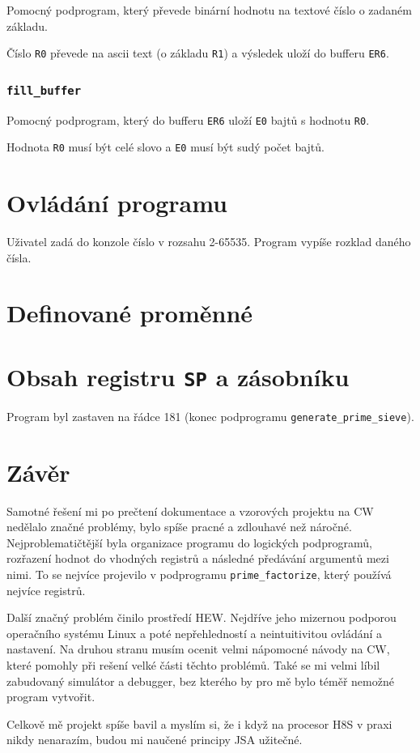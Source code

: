 \documentclass[12pt]{article}
\newcommand{\code}[1]{\colorbox{light-gray}{\mbox{\texttt{#1}}}}
\begin{document}
Pomocný podprogram, který převede binární hodnotu na textové číslo o zadaném základu.

Číslo \code{R0} převede na ascii text (o základu \code{R1}) a výsledek uloží do bufferu \code{ER6}.

\subsubsection{\code{fill\_buffer}}

Pomocný podprogram, který do bufferu \code{ER6} uloží \code{E0} bajtů s hodnotu \code{R0}.

Hodnota \code{R0} musí být celé slovo a \code{E0} musí být sudý počet bajtů.

\section{Ovládání programu}

Uživatel zadá do konzole číslo v rozsahu 2-65535. Program vypíše rozklad daného čísla.

\section{Definované proměnné}


\section{Obsah registru \code{SP} a zásobníku}

Program byl zastaven na řádce 181 (konec podprogramu \code{generate\_prime\_sieve}).


\section{Závěr}

Samotné řešení mi po prečtení dokumentace a vzorových projektu na CW nedělalo značné problémy, bylo
spíše pracné a zdlouhavé než náročné. Nejproblematičtější byla organizace programu do logických
podprogramů, rozřazení hodnot do vhodných registrů a následné předávání argumentů mezi nimi. To se
nejvíce projevilo v podprogramu \code{prime\_factorize}, který používá nejvíce registrů.

Další značný problém činilo prostředí HEW. Nejdříve jeho mizernou podporou operačního systému Linux
a poté nepřehledností a neintuitivitou ovládání a nastavení. Na druhou stranu musím ocenit velmi
nápomocné návody na CW, které pomohly při rešení velké části těchto problémů. Také se mi velmi
líbil zabudovaný simulátor a debugger, bez kterého by pro mě bylo téměř nemožné program vytvořit.

Celkově mě projekt spíše bavil a myslím si, že i když na procesor H8S v praxi nikdy nenarazím,
budou mi naučené principy JSA užitečné.
\end{document}
